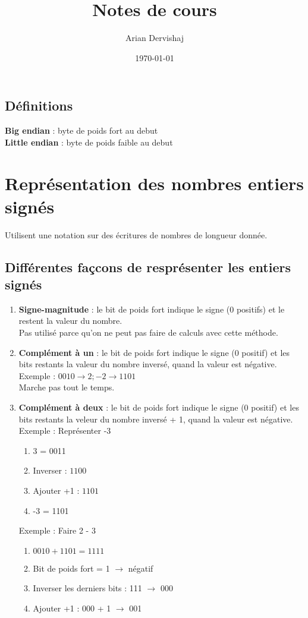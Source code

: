 \documentclass[a4paper, 12pt]{article}
\title{Notes de cours}
\author{Arian Dervishaj}
\date{\today}
\begin{document}
\maketitle
\pagebreak

\subsection*{Définitions}
\textbf{Big endian} : byte de poids fort au debut \\
\textbf{Little endian} : byte de poids faible au debut


\section*{Représentation des nombres entiers signés}
Utilisent une notation sur des écritures de nombres de longueur donnée.
\subsection*{Différentes façcons de resprésenter les entiers signés}
\begin{enumerate}
    \item   \textbf{Signe-magnitude} : le bit de poids fort indique le signe (0 positifs) et le restent la valeur du nombre. \\
            Pas utilisé parce qu'on ne peut pas faire de calculs avec cette méthode.
    \item   \textbf{Complément à un} : le bit de poids fort indique le signe (0 positif) et les bits restants la valeur du nombre inversé, quand la valeur est négative. \\
            Exemple : $0010 \rightarrow 2; -2 \rightarrow 1101$ \\
            Marche pas tout le temps.
    \item   \textbf{Complément à deux} : le bit de poids fort indique le signe (0 positif) et les bits restants la veleur du nombre inversé + 1, quand la valeur est négative. \\
            Exemple : Représenter -3
            \begin{enumerate}
                \item 3 = 0011
                \item Inverser : $1100$
                \item Ajouter +1 : $1101$
                \item -3 = 1101 
            \end{enumerate} 
            Exemple : Faire 2 - 3
            \begin{enumerate}
                \item $0010 + 1101 = 1111$
                \item Bit de poids fort = 1 $\rightarrow$ négatif
                \item Inverser les derniers bits : 111 $\rightarrow$ 000
                \item Ajouter +1 : 000 + 1 $\rightarrow$ 001
            \end{enumerate} 
\end{enumerate}
\end{document}
